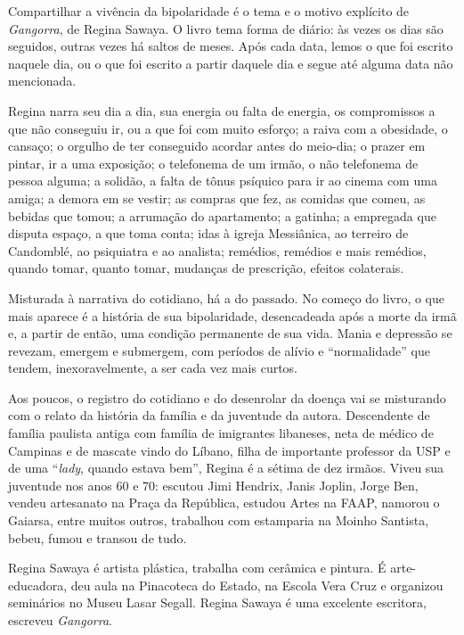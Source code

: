 
{Compartilhar a vivência da bipolaridade} é o tema e o motivo explícito
de \emph{Gangorra}{, de Regina Sawaya. O livro tema forma de diário: às
vezes os dias são seguidos, outras vezes há saltos de meses. Após cada
data, lemos o que foi escrito naquele dia, ou o que foi escrito a partir
daquele dia e segue até alguma data não mencionada.}

{Regina narra seu dia a dia, sua energia ou falta de energia, os
compromissos a que não conseguiu ir, ou a que foi com muito esforço; a
raiva com a obesidade, o cansaço; o orgulho de ter conseguido acordar
antes do meio-dia; o prazer em pintar, ir a uma exposição; o telefonema
de um irmão, o não telefonema de pessoa alguma; a solidão, a falta de
tônus psíquico para ir ao cinema com uma amiga; a demora em se vestir;
as compras que fez, as comidas que comeu, as bebidas que tomou; a
arrumação do apartamento; a gatinha; a empregada que disputa espaço, a
que toma conta; idas à igreja Messiânica, ao terreiro de Candomblé, ao
psiquiatra e ao analista; remédios, remédios e mais remédios, quando
tomar, quanto tomar, mudanças de prescrição, efeitos colaterais.}

{Misturada à narrativa do cotidiano, há a do passado. No começo do
livro, o que mais aparece é a história de sua bipolaridade, desencadeada
após a morte da irmã e, a partir de então, uma condição permanente de
sua vida. Mania e depressão se revezam, emergem e submergem, com
períodos de alívio e ``normalidade'' que tendem, inexoravelmente, a ser
cada vez mais curtos.}

{Aos poucos, o registro do cotidiano e do desenrolar da doença vai se
misturando com o relato da história da família e da juventude da autora.
Descendente de família paulista antiga com família de imigrantes
libaneses, neta de médico de Campinas e de mascate vindo do Líbano,
filha de importante professor da USP e de uma ``}\emph{lady}{, quando
estava bem'', Regina é a sétima de dez irmãos. Viveu sua juventude nos
anos 60 e 70: escutou Jimi Hendrix, Janis Joplin, Jorge Ben, vendeu
artesanato na Praça da República, estudou Artes na FAAP, namorou o
Gaiarsa, entre muitos outros, trabalhou com estamparia na Moinho
Santista, bebeu, fumou e transou de tudo.}

\asterisc

Regina Sawaya é artista plástica, trabalha com cerâmica e pintura. É
arte-educadora, deu aula na Pinacoteca do Estado, na Escola Vera Cruz e
organizou seminários no Museu Lasar Segall. Regina Sawaya é uma
excelente escritora, escreveu \emph{Gangorra}.

